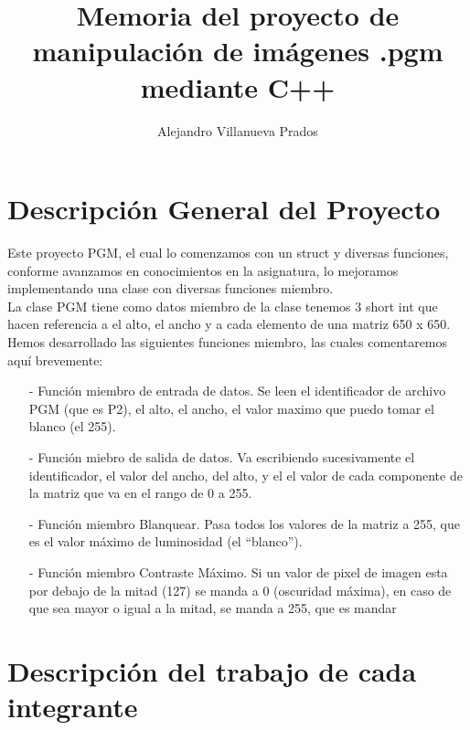 \documentclass[a4paper, 11pt, spanish]{article}
\title{Memoria del proyecto de manipulación de imágenes .pgm mediante C++}
\author{Alejandro Villanueva Prados}
\date{}
\begin{document}
\maketitle

\section{Descripción General del Proyecto}

Este proyecto PGM, el cual lo comenzamos con un struct y diversas funciones, conforme avanzamos en conocimientos en la asignatura, lo mejoramos implementando una clase con diversas funciones miembro.
\\

La clase PGM tiene como datos miembro de la clase tenemos 3 short int que hacen referencia a el alto, el ancho y  a cada elemento de una matriz 650 x 650.
\\

Hemos desarrollado las siguientes funciones miembro, las cuales comentaremos aquí brevemente:
\\

\begin{itemize}
\item[-] Función miembro de entrada de datos. Se leen el identificador de archivo PGM (que es P2), el alto, el ancho, el valor maximo que puedo tomar el blanco (el 255).

\item[-] Función miebro de salida de datos. Va escribiendo sucesivamente el identificador, el valor del ancho, del alto, y el el valor de cada componente de la matriz que va en el rango de 0 a 255.

\item[-] Función miembro Blanquear. Pasa todos los valores de la matriz a 255, que es el valor máximo de luminosidad (el “blanco”).

\item[-] Función miembro Contraste Máximo. Si un valor de pixel de imagen esta por debajo de la mitad (127) se manda a 0 (oscuridad máxima), en caso de que sea mayor o igual a la mitad, se manda a 255, que es mandar 

\end{itemize}

\section{Descripción del trabajo de cada integrante}
\end{document}
